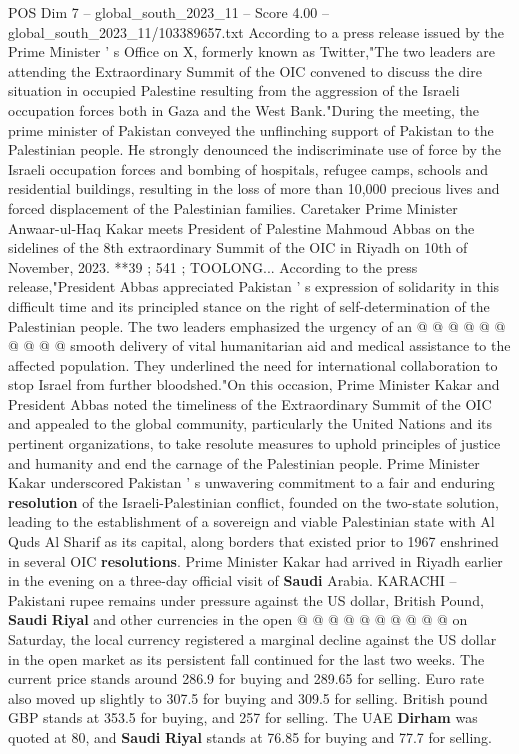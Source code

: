 \begin{textsample}{POS Dim 7 – global\_south\_2023\_11 – Score 4.00 – global\_south\_2023\_11/103389657.txt}  \label{ex:f7_pos_120}
According to a press release issued by the Prime Minister ' s Office on X, formerly known as Twitter,"The two leaders are attending the Extraordinary Summit of the OIC convened to discuss the dire situation in occupied Palestine resulting from the aggression of the Israeli occupation forces both in Gaza and the West Bank."During the meeting, the prime minister of Pakistan conveyed the unflinching support of Pakistan to the Palestinian people.
He strongly denounced the indiscriminate use of force by the Israeli occupation forces and bombing of hospitals, refugee camps, schools and residential buildings, resulting in the loss of more than 10,000 precious lives and forced displacement of the Palestinian families.
Caretaker Prime Minister Anwaar-ul-Haq Kakar meets President of Palestine Mahmoud Abbas on the sidelines of the 8th extraordinary Summit of the OIC in Riyadh on 10th of November, 2023. **39 ; 541 ; TOOLONG...
According to the press release,"President Abbas appreciated Pakistan ' s expression of solidarity in this difficult time and its principled stance on the right of self-determination of the Palestinian people.
The two leaders emphasized the urgency of an @ @ @ @ @ @ @ @ @ @ smooth delivery of vital humanitarian aid and medical assistance to the affected population.
They underlined the need for international collaboration to stop Israel from further bloodshed."On this occasion, Prime Minister Kakar and President Abbas noted the timeliness of the Extraordinary Summit of the OIC and appealed to the global community, particularly the United Nations and its pertinent organizations, to take resolute measures to uphold principles of justice and humanity and end the carnage of the Palestinian people.
Prime Minister Kakar underscored Pakistan ' s unwavering commitment to a fair and enduring \textbf{resolution} of the Israeli-Palestinian conflict, founded on the two-state solution, leading to the establishment of a sovereign and viable Palestinian state with Al Quds Al Sharif as its capital, along borders that existed prior to 1967 enshrined in several OIC \textbf{resolutions}.
Prime Minister Kakar had arrived in Riyadh earlier in the evening on a three-day official visit of \textbf{Saudi} Arabia.
KARACHI -- Pakistani rupee remains under pressure against the US dollar, British Pound, \textbf{Saudi} \textbf{Riyal} and other currencies in the open @ @ @ @ @ @ @ @ @ @ on Saturday, the local currency registered a marginal decline against the US dollar in the open market as its persistent fall continued for the last two weeks.
The current price stands around 286.9 for buying and 289.65 for selling.
Euro rate also moved up slightly to 307.5 for buying and 309.5 for selling.
British pound GBP stands at 353.5 for buying, and 257 for selling.
The UAE \textbf{Dirham} was quoted at 80, and \textbf{Saudi} \textbf{Riyal} stands at 76.85 for buying and 77.7 for selling.

\end{textsample}
